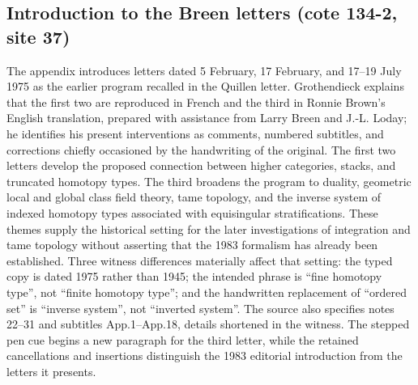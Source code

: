 \subsection*{Introduction to the Breen letters (cote 134-2, site 37)}
The appendix introduces letters dated 5 February, 17 February, and 17--19 July 1975 as the earlier program recalled in the Quillen letter. Grothendieck explains that the first two are reproduced in French and the third in Ronnie Brown's English translation, prepared with assistance from Larry Breen and J.-L. Loday; he identifies his present interventions as comments, numbered subtitles, and corrections chiefly occasioned by the handwriting of the original. The first two letters develop the proposed connection between higher categories, stacks, and truncated homotopy types. The third broadens the program to duality, geometric local and global class field theory, tame topology, and the inverse system of indexed homotopy types associated with equisingular stratifications. These themes supply the historical setting for the later investigations of integration and tame topology without asserting that the 1983 formalism has already been established. Three witness differences materially affect that setting: the typed copy is dated 1975 rather than 1945; the intended phrase is ``fine homotopy type'', not ``finite homotopy type''; and the handwritten replacement of ``ordered set'' is ``inverse system'', not ``inverted system''. The source also specifies notes 22--31 and subtitles App.1--App.18, details shortened in the witness. The stepped pen cue begins a new paragraph for the third letter, while the retained cancellations and insertions distinguish the 1983 editorial introduction from the letters it presents.

